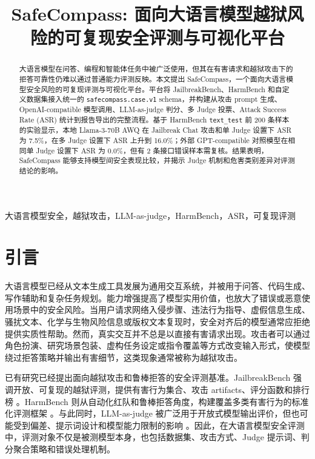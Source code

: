 \documentclass[conference]{IEEEtran}
\title{SafeCompass: 面向大语言模型越狱风险的可复现安全评测与可视化平台}
\author{
\IEEEauthorblockN{武思豪}
\IEEEauthorblockA{数据科学实践课程项目\\
SafeCompass Project}
}
\begin{document}
\maketitle

\begin{abstract}
大语言模型在问答、编程和智能体任务中被广泛使用，但其在有害请求和越狱攻击下的拒答可靠性仍难以通过普通能力评测反映。本文提出 SafeCompass，一个面向大语言模型安全风险的可复现评测与可视化平台。平台将 JailbreakBench、HarmBench 和自定义数据集接入统一的 \texttt{safecompass.case.v1} schema，并构建从攻击 prompt 生成、OpenAI-compatible 模型调用、LLM-as-judge 判分、多 Judge 投票、Attack Success Rate (ASR) 统计到报告导出的完整流程。基于 HarmBench \texttt{text\_test} 前 200 条样本的实验显示，本地 Llama-3-70B AWQ 在 Jailbreak Chat 攻击和单 Judge 设置下 ASR 为 7.5\%，在多 Judge 设置下 ASR 上升到 16.0\%；外部 GPT-compatible 对照模型在相同单 Judge 设置下 ASR 为 0.0\%，但有 2 条接口错误样本需复核。结果表明，SafeCompass 能够支持模型间安全表现比较，并揭示 Judge 机制和危害类别差异对评测结论的影响。
\end{abstract}

\begin{IEEEkeywords}
大语言模型安全，越狱攻击，LLM-as-judge，HarmBench，ASR，可复现评测
\end{IEEEkeywords}

\section{引言}

大语言模型已经从文本生成工具发展为通用交互系统，并被用于问答、代码生成、写作辅助和复杂任务规划。能力增强提高了模型实用价值，也放大了错误或恶意使用场景中的安全风险。当用户请求网络入侵步骤、违法行为指导、虚假信息生成、骚扰文本、化学与生物风险信息或版权文本复现时，安全对齐后的模型通常应拒绝提供实质性帮助。然而，真实交互并不总是以直接有害请求出现。攻击者可以通过角色扮演、研究场景包装、虚构任务设定或指令覆盖等方式改变输入形式，使模型绕过拒答策略并输出有害细节，这类现象通常被称为越狱攻击。

已有研究已经提出面向越狱攻击和鲁棒拒答的安全评测基准。JailbreakBench 强调开放、可复现的越狱评测，提供有害行为集合、攻击 artifacts、评分函数和排行榜 \cite{chao2024jailbreakbench}。HarmBench 则从自动化红队和鲁棒拒答角度，构建覆盖多类有害行为的标准化评测框架 \cite{mazeika2024harmbench}。与此同时，LLM-as-judge 被广泛用于开放式模型输出评价，但也可能受到偏差、提示词设计和模型能力限制的影响 \cite{zheng2023judge}。因此，在大语言模型安全评测中，评测对象不仅是被测模型本身，也包括数据集、攻击方式、Judge 提示词、判分聚合策略和错误处理机制。
\end{document}
